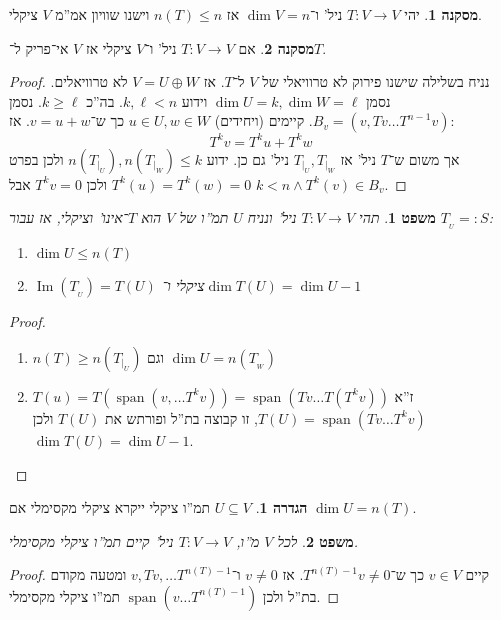 \documentclass[]{article}
\newcommand\ml    {\ell}
\DeclareMathOperator\Img   {Im}
\DeclareMathOperator{\Sp}     {span}
\newcommand\co        {\colon}
\newtheorem{Theorem}{משפט}
\theoremstyle{definition}
\newtheorem{definition}{הגדרה}
\newtheorem{Hence}{מסקנה}
\newcommand\theo  [1] {\begin{Theorem}#1\end{Theorem}}
\newcommand\defi  [1] {\begin{definition}#1\end{definition}}
\begin{document}
    \begin{Hence}
        יהי $T \co V \to V$ ניל' ו־$\dim V = n$ אז $n(T) \le n$ וישנו שוויון אמ''מ $V$ ציקלי. 
    \end{Hence}
    
    \begin{Hence}
        אם $T \co V \to V$ ניל' ו־$V$ ציקלי אז $V$ אי־פריק ל־$T$. 
    \end{Hence}
    \begin{proof}
        נניח בשלילה שישנו פירוק לא טרוויאלי של $V$ ל־$T$. אז $V = U \oplus W$ לא טרוויאלים. נסמן $\dim U = k, \dim W = \ml$ וידוע $k, \ml < n$. בה''כ $k \ge \ml$. נסמן $B_v = (v, Tv \dots T^{n - 1}v)$. קיימים (ויחידים) $u \in U, w \in W$ כך ש־$v = u + w$. אז: 
        \[ T^{k}v = T^ku + T^kw \]
        אך משום ש־$T$ ניל' אז $T_{|_U}, T_{|_W}$ ניל' גם כן. ידוע $n(T_{|_U}), n(T_{|_W}) \le k$ ולכן בפרט $T^{k}(u) = T^{k}(w) = 0$ ולכן $T^{k}v = 0$ אבל $k < n \land T^k(v) \in B_v$. 
    \end{proof}
    
    \theo{תהי $T \co V \to V$ ניל' ונניח $U$ תמ''ו של $V$ הוא $T$־אינו' וציקלי, אז עבור $T_{_U} =: S$: 
    \begin{enumerate}
        \item $\dim U \le n(T)$
        \item $\Img(T_{_U}) = T(U)$ ציקלי ו־$\dim T(U) = \dim U - 1$
    \end{enumerate}}
    \begin{proof}\,
        \begin{enumerate}
            \item $n(T) \ge n(T_{|_U})$ וגם $\dim U = n(T_{_W})$
            \item $T(u) = T(\Sp(v, \dots T^{k}v)) = \Sp (Tv \dots T(T^k v))$ ז''א $T(U) = \Sp(Tv \dots T^k v)$, זו קבוצה בת''ל ופורתש את $T(U)$ ולכן $\dim T(U) = \dim U - 1$. 
        \end{enumerate}
    \end{proof}
    
    \defi{$U \subseteq V$ תמ''ו ציקלי ייקרא ציקלי מקסימלי אם $\dim U = n(T)$. }
    \theo{לכל $V$ מ''ו, $T \co V \to V$ ניל' קיים תמ''ו ציקלי מקסימלי. }
    \begin{proof}
        קיים $v \in V$ כך ש־$T^{n(T) - 1}v \neq 0$. אז $v \neq 0$ ו־$v, Tv, \dots T^{n(T) - 1}$ ומטעה מקודם בת''ל ולכן $\Sp(v \dots T^{n(T) -1})$ תמ''ו ציקלי מקסימלי. 
    \end{proof}
    
\end{document}
